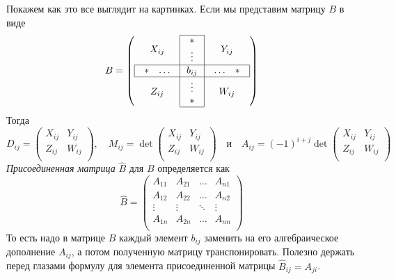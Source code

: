Покажем как это все выглядит на картинках.
Если мы представим матрицу $B$ в виде
\[
B =
\left(
\begin{array}{c|c|c}
\cline{2-2}
{X_{ij}}&{
\begin{array}{c}
{*}\\{\vdots}
\end{array}
}&{Y_{ij}}\\
\hline
\multicolumn{1}{|c|}{
\begin{array}{cc}
{*}&{\ldots}
\end{array}
}&{b_{ij}}&\multicolumn{1}{c|}{
\begin{array}{cc}
{\ldots}&{*}
\end{array}
}\\
\hline
{Z_{ij}}&{
\begin{array}{c}
{\vdots}\\{*}
\end{array}
}&{W_{ij}}\\
\cline{2-2}
\end{array}
\right)
\]
Тогда
\[
D_{ij} =
\begin{pmatrix}
{X_{ij}}&{Y_{ij}}\\
{Z_{ij}}&{W_{ij}}\\
\end{pmatrix},\quad
M_{ij} = 
\det
\begin{pmatrix}
{X_{ij}}&{Y_{ij}}\\
{Z_{ij}}&{W_{ij}}\\
\end{pmatrix}\quad\text{и}\quad
A_{ij} =
(-1)^{i+j}
\det
\begin{pmatrix}
{X_{ij}}&{Y_{ij}}\\
{Z_{ij}}&{W_{ij}}\\
\end{pmatrix}
\]
{\it Присоединенная матрица} $\hat B$ для $B$ определяется как
\[
\hat B = 
\begin{pmatrix}
{A_{11}}&{A_{21}}&{\ldots}&{A_{n1}}\\
{A_{12}}&{A_{22}}&{\ldots}&{A_{n2}}\\
{\vdots}&{\vdots}&{\ddots}&{\vdots}\\
{A_{1n}}&{A_{2n}}&{\ldots}&{A_{nn}}\\
\end{pmatrix}
\]
То есть надо в матрице $B$ каждый элемент $b_{ij}$ заменить на его алгебраическое дополнение $A_{ij}$, а потом полученную матрицу транспонировать.
Полезно держать перед глазами формулу для элемента присоединенной матрицы $\hat B_{ij} = A_{ji}$.

